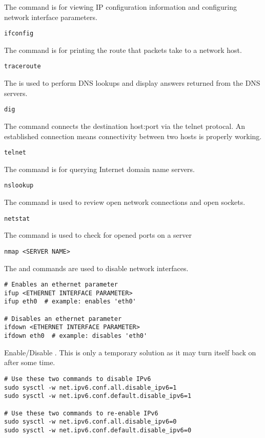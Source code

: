 The  command is for viewing IP configuration information and configuring network interface parameters.
\begin{lstlisting}
ifconfig
\end{lstlisting}

The  command is for printing the route that packets take to a network host.
\begin{lstlisting}
traceroute
\end{lstlisting}

The  is used to perform DNS lookups and display answers returned from the DNS servers.
\begin{lstlisting}
dig
\end{lstlisting}

The  command connects the destination host:port via the telnet protocal. An established connection means connectivity between two hosts is properly working.
\begin{lstlisting}
telnet
\end{lstlisting}

The  command is for querying Internet domain name servers.
\begin{lstlisting}
nslookup
\end{lstlisting}

The  command is used to review open network connections and open sockets. 
\begin{lstlisting}
netstat
\end{lstlisting}

The  command is used to check for opened ports on a server
\begin{lstlisting}
nmap <SERVER NAME>
\end{lstlisting}

The  and  commands are used to disable network interfaces.
\begin{lstlisting}
# Enables an ethernet parameter
ifup <ETHERNET INTERFACE PARAMETER>
ifup eth0  # example: enables 'eth0'

# Disables an ethernet parameter
ifdown <ETHERNET INTERFACE PARAMETER>
ifdown eth0  # example: disables 'eth0'
\end{lstlisting}

Enable/Disable . This is only a temporary solution as it may turn itself back on after some time.
\begin{lstlisting}
# Use these two commands to disable IPv6
sudo sysctl -w net.ipv6.conf.all.disable_ipv6=1
sudo sysctl -w net.ipv6.conf.default.disable_ipv6=1

# Use these two commands to re-enable IPv6
sudo sysctl -w net.ipv6.conf.all.disable_ipv6=0
sudo sysctl -w net.ipv6.conf.default.disable_ipv6=0
\end{lstlisting}







